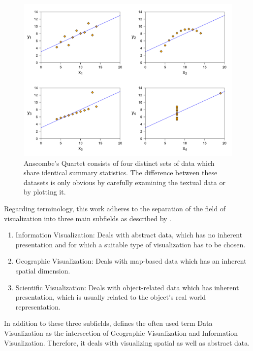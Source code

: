 \begin{figure}[tp]
\centering
\includegraphics[keepaspectratio,width=\linewidth,height=\fullh / 3]{diagrams/anscombe.pdf}
\caption[Anscombe's Quartet]{
  Anscombe's Quartet consists of four distinct sets of data which share identical summary statistics.
  The difference between these datasets is only obvious by carefully examining the textual data or by plotting it.
}
\label{fig:AnscombesQuartet}
\end{figure}

Regarding terminology, this work adheres to the separation of the field of visualization into three main subfields as described by \cite{IVISCourseNotes}.

\begin{enumerate}
\item Information Visualization: Deals with abstract data, which has no inherent presentation and for which a suitable type of visualization has to be chosen.
\item Geographic Visualization: Deals with map-based data which has an inherent spatial dimension. 
\item Scientific Visualization: Deals with object-related data which has inherent presentation, which is usually related to the object's real world representation.
\end{enumerate}

In addition to these three subfields, \cite{IVISCourseNotes} defines the often used term Data Visualization as the intersection of Geographic Visualization and Information Visualization.
Therefore, it deals with visualizing spatial as well as abstract data.

